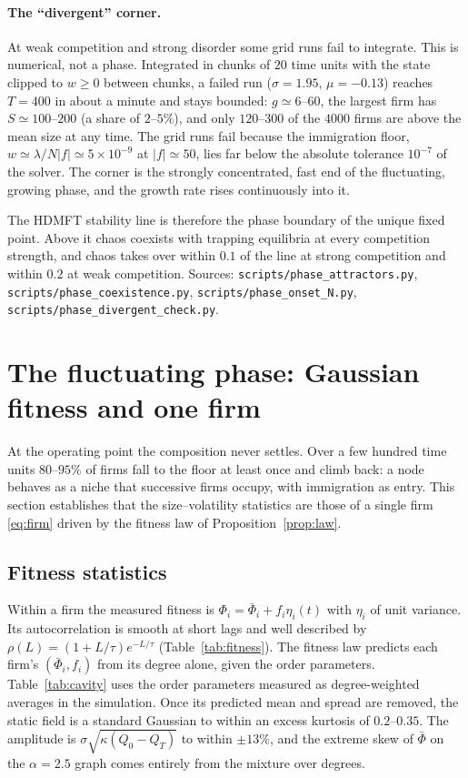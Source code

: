 \documentclass[11pt]{article}
\newcommand{\bPhi}{\bar\Phi}
\begin{document}
\paragraph{The ``divergent'' corner.}  At weak competition and strong disorder some grid runs fail to
integrate.  This is numerical, not a phase.  Integrated in chunks of $20$ time units with the state
clipped to $w\ge0$ between chunks, a failed run ($\sigma=1.95$, $\mu=-0.13$) reaches $T=400$ in about a
minute and stays bounded: $g\simeq6$--$60$, the largest firm has $S\simeq100$--$200$ (a share of
$2$--$5\%$), and only $120$--$300$ of the $4000$ firms are above the mean size at any time.  The grid
runs fail because the immigration floor, $w\simeq\lambda/N|f|\simeq5\times10^{-9}$ at $|f|\simeq50$, lies
far below the absolute tolerance $10^{-7}$ of the solver.  The corner is the strongly concentrated,
fast end of the fluctuating, growing phase, and the growth rate rises continuously into it.

The HDMFT stability line is therefore the phase boundary of the unique fixed point.  Above it
chaos coexists with trapping equilibria at every competition strength, and chaos takes over
within $0.1$ of the line at strong competition and within $0.2$ at weak competition.  Sources:
\texttt{scripts/phase\_attractors.py}, \texttt{scripts/phase\_coexistence.py},
\texttt{scripts/phase\_onset\_N.py}, \texttt{scripts/phase\_divergent\_check.py}.

\section{The fluctuating phase: Gaussian fitness and one firm}
\label{sec:onefirm}

At the operating point the composition never settles.  Over a few hundred time units
$80$--$95\%$ of firms fall to the floor at least once and climb back: a node behaves as a niche
that successive firms occupy, with immigration as entry.  This section establishes that the
size--volatility statistics are those of a single firm \eqref{eq:firm} driven by the fitness law
of Proposition~\ref{prop:law}.

\subsection{Fitness statistics}
\label{sec:fitnesscheck}

Within a firm the measured fitness is $\Phi_i=\bPhi_i+f_i\eta_i(t)$ with $\eta_i$ of unit variance.
Its autocorrelation is smooth at short lags and well described by
$\rho(L)=(1+L/\tau)e^{-L/\tau}$ (Table~\ref{tab:fitness}).  The fitness law predicts each firm's
$(\bPhi_i,f_i)$ from its degree alone, given the order parameters.  Table~\ref{tab:cavity} uses the
order parameters measured as degree-weighted averages in the simulation.  Once its predicted mean
and spread are removed, the static field is a standard Gaussian to within an excess kurtosis of
$0.2$--$0.35$.  The amplitude is $\sigma\sqrt{\kappa(Q_0-Q_T)}$ to within $\pm13\%$, and the
extreme skew of $\bPhi$ on the $\alpha=2.5$ graph comes entirely from the mixture over degrees.
\end{document}
